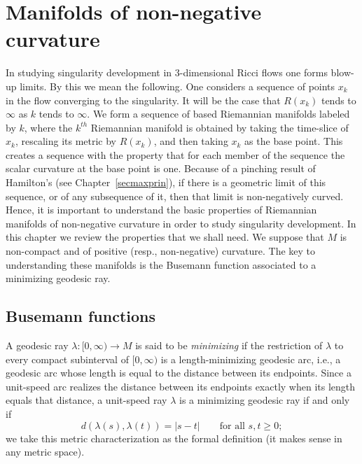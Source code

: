 \chapter{Manifolds of non-negative curvature}
\label{chap:manifolds-nonneg-curvature}
\label{nonnegcurv}

In studying singularity development in $3$-dimensional Ricci flows
one forms blow-up limits. By this we mean the following. One
considers a sequence of points $x_k$ in the flow converging to the
singularity. It will be the case that $R(x_k)$ tends to $\infty$ as
$k$ tends to $\infty$. We form a sequence of based Riemannian
manifolds labeled by $k$, where the $k^{th}$ Riemannian manifold is
obtained by taking the time-slice of $x_k$, rescaling its metric by
$R(x_k)$, and then taking $x_k$ as the base point. This creates a
sequence with the property that for each member of the sequence the
scalar curvature at the base point is one. Because of a pinching
result of Hamilton's (see Chapter~\ref{secmaxprin}), if there is a
geometric limit of this sequence, or of any subsequence of it, then
that limit is non-negatively curved. Hence, it is important to
understand the basic properties of Riemannian manifolds of
non-negative curvature in order to study singularity development. In
this chapter we review the properties that we shall need. We suppose
that $M$ is non-compact and of positive (resp., non-negative)
curvature. The key to understanding these manifolds is the Busemann
function associated to a minimizing geodesic ray.


\section{Busemann functions}

\begin{definition}
\label{def:minimizing-geodesic-ray}
\leanok
{}
A geodesic ray $\lambda\colon [0,\infty)\to M$ is said to be {\em
minimizing} if the restriction of $\lambda$ to every compact
subinterval of $[0,\infty)$ is a length-minimizing geodesic arc,
i.e., a geodesic arc whose length is equal to the distance between
its endpoints. Since a unit-speed arc realizes the distance between
its endpoints exactly when its length equals that distance, a
unit-speed ray $\lambda$ is a minimizing geodesic ray if and only if
$$d(\lambda(s),\lambda(t))=|s-t|\qquad\text{for all }s,t\ge 0;$$
we take this metric characterization as the formal definition (it
makes sense in any metric space).
\end{definition}

